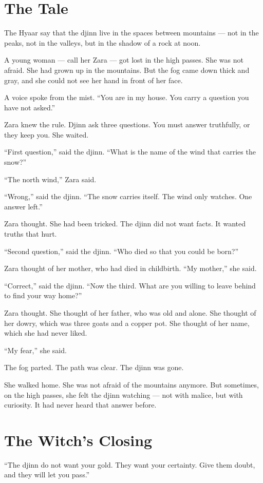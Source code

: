 \documentclass[10pt,twoside]{book}
\begin{document}
\section*{The Tale}
The Hyaar say that the djinn live in the spaces between mountains --- not in the peaks, not in the valleys, but in the shadow of a rock at noon.

A young woman --- call her Zara --- got lost in the high passes. She was not afraid. She had grown up in the mountains. But the fog came down thick and gray, and she could not see her hand in front of her face.

A voice spoke from the mist. ``You are in my house. You carry a question you have not asked.''

Zara knew the rule. Djinn ask three questions. You must answer truthfully, or they keep you. She waited.

``First question,'' said the djinn. ``What is the name of the wind that carries the snow?''

``The north wind,'' Zara said.

``Wrong,'' said the djinn. ``The snow carries itself. The wind only watches. One answer left.''

Zara thought. She had been tricked. The djinn did not want facts. It wanted truths that hurt.

``Second question,'' said the djinn. ``Who died so that you could be born?''

Zara thought of her mother, who had died in childbirth. ``My mother,'' she said.

``Correct,'' said the djinn. ``Now the third. What are you willing to leave behind to find your way home?''

Zara thought. She thought of her father, who was old and alone. She thought of her dowry, which was three goats and a copper pot. She thought of her name, which she had never liked.

``My fear,'' she said.

The fog parted. The path was clear. The djinn was gone.

She walked home. She was not afraid of the mountains anymore. But sometimes, on the high passes, she felt the djinn watching --- not with malice, but with curiosity. It had never heard that answer before.

\section*{The Witch's Closing}
``The djinn do not want your gold. They want your certainty. Give them doubt, and they will let you pass.''
\end{document}
